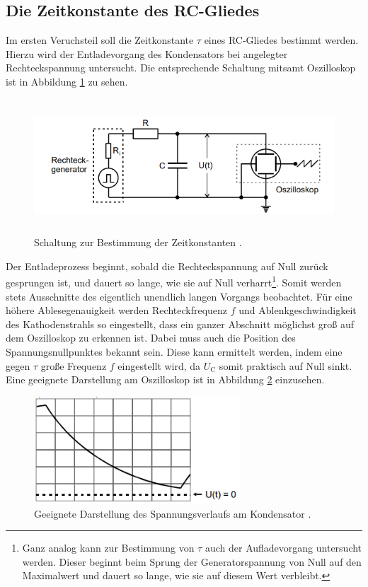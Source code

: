 \subsection{Die Zeitkonstante des RC-Gliedes}
\label{sec:durchf_a}
Im ersten Veruchsteil soll die Zeitkonstante $\tau$ eines RC-Gliedes bestimmt werden.
Hierzu wird der Entladevorgang des Kondensators bei angelegter Rechteckspannung untersucht.
Die entsprechende Schaltung mitsamt Oszilloskop ist in Abbildung \ref{fig:zeitkonst} zu sehen.
\begin{figure}[H]
    \centering
    \includegraphics[height=5cm]{abbildungen/zeitkonstante.png}
    \caption[short]{Schaltung zur Bestimmung der Zeitkonstanten \cite{man:v353}.}
    \label{fig:zeitkonst}
\end{figure}
\noindent
Der Entladeprozess beginnt, sobald die Rechteckspannung auf Null zurück gesprungen ist, und dauert so lange, wie sie auf Null verharrt\footnote{Ganz 
analog kann zur Bestimmung von $\tau$ auch der Aufladevorgang untersucht werden.
Dieser beginnt beim Sprung der Generatorspannung von Null auf den Maximalwert und dauert so lange, 
wie sie auf diesem Wert verbleibt.}.
Somit werden stets Ausschnitte des eigentlich unendlich langen Vorgangs beobachtet.
Für eine höhere Ablesegenauigkeit werden Rechteckfrequenz $f$ und Ablenkgeschwindigkeit des Kathodenstrahls so eingestellt, 
dass ein ganzer Abschnitt möglichst groß auf dem Oszilloskop zu erkennen ist.
Dabei muss auch die Position des Spannungsnullpunktes bekannt sein.
Diese kann ermittelt werden, indem eine gegen $\tau$ große Frequenz $f$ eingestellt wird, da $U_\text{C}$ somit praktisch auf Null sinkt.
Eine geeignete Darstellung am Oszilloskop ist in Abbildung \ref{fig:spannungsverlauf} einzusehen.
\begin{figure}[H]
    \centering
    \includegraphics[height=4cm]{abbildungen/geeignete_darstellung.png}
    \caption{Geeignete Darstellung des Spannungsverlaufs am Kondensator \cite{man:v353}.}
    \label{fig:spannungsverlauf}
\end{figure}
